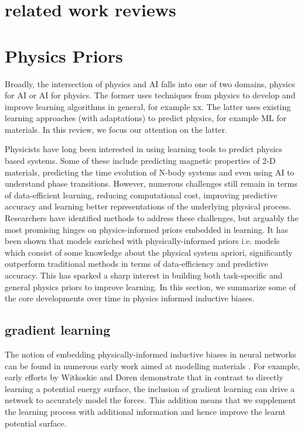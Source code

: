 \documentclass{article}
\begin{document}
\section{related work reviews}

\section{Physics Priors}

Broadly, the intersection of physics and AI falls into one of two domains, physics for AI or AI for physics. The former uses techniques from physics to develop and improve learning algorithms in general, for example xx. The latter uses existing learning approaches (with adaptations) to predict physics, for example ML for materials. In this review, we focus our attention on the latter.

Physicists have long been interested in using learning tools to predict physics based systems. Some of these include predicting magnetic properties of 2-D materials, predicting the time evolution of N-body systems and even using AI to understand phase transitions. However, numerous challenges still remain in terms of data-efficient learning, reducing computational cost, improving predictive accuracy and learning better representations of the underlying physical process. Researchers have identified methods to address these challenges, but arguably the most promising hinges on physics-informed priors embedded in learning. It has been shown that models enriched with physically-informed priors i.e. models which consist of some knowledge about the physical system apriori, significantly outperform traditional methods in terms of data-efficiency and predictive accuracy. This has sparked a sharp interest in building both task-specific and general physics priors to improve learning. In this section, we summarize some of the core developments over time in physics informed inductive biases. 

\subsection{gradient learning}


The notion of embedding physically-informed inductive biases in neural networks can be found in numerous early work aimed at modelling materials \cite{witkoskie_neural_2005, pukrittayakamee_simultaneous_2009, smith_ani-1_2017, rupp_fast_2012, yao_tensormol-01_2018}. For example, early efforts by Witkoskie and Doren \cite{witkoskie_neural_2005} demonstrate that in contrast to directly learning a potential energy surface, the inclusion of gradient learning can drive a network to accurately model the forces. This addition means that we supplement the learning process with additional information and hence improve the learnt potential surface. 
\end{document}
